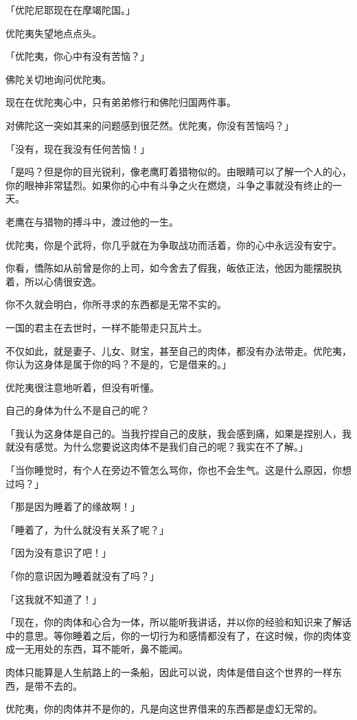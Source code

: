 \documentclass[twoside,openany]{book}
\begin{document}
「优陀尼耶现在在摩竭陀国。」

优陀夷失望地点点头。

「优陀夷，你心中有没有苦恼？」

佛陀关切地询问优陀夷。

现在在优陀夷心中，只有弟弟修行和佛陀归国两件事。

对佛陀这一突如其来的问题感到很茫然。优陀夷，你没有苦恼吗？」

「没有，现在我没有任何苦恼！」

「是吗？但是你的目光锐利，像老鹰盯着猎物似的。由眼睛可以了解一个人的心，你的眼神非常猛烈。如果你的心中有斗争之火在燃烧，斗争之事就没有终止的一天。

老鹰在与猎物的搏斗中，渡过他的一生。

优陀夷，你是个武将，你几乎就在为争取战功而活着，你的心中永远没有安宁。

你看，憍陈如从前曾是你的上司，如今舍去了假我，皈依正法，他因为能摆脱执着，所以心倩很安逸。

你不久就会明白，你所寻求的东西都是无常不实的。

一国的君主在去世时，一样不能带走只瓦片土。

不仅如此，就是妻子、儿女、财宝，甚至自己的肉体，都没有办法带走。优陀夷，你认为这身体是属于你的吗？不是的，它是借来的。」

优陀夷很注意地听着，但没有听懂。

自己的身体为什么不是自己的呢？

「我认为这身体是自己的。当我拧捏自己的皮肤，我会感到痛，如果是捏别人，我就没有感觉。为什么您要说这肉体不是我们自己的呢？我实在不了解。」

「当你睡觉时，有个人在旁边不管怎么骂你，你也不会生气。这是什么原因，你想过吗？」

「那是因为睡着了的缘故啊！」

「睡着了，为什么就没有关系了呢？」

「因为没有意识了吧！」

「你的意识因为睡着就没有了吗？」

「这我就不知道了！」

「现在，你的肉体和心合为一体，所以能听我讲话，并以你的经验和知识来了解话中的意思。等你睡着之后，你的一切行为和感情都没有了，在这时候，你的肉体变成一无用处的东西，耳不能听，鼻不能闻。

肉体只能算是人生航路上的一条船，因此可以说，肉体是借自这个世界的一样东西，是带不去的。

优陀夷，你的肉体并不是你的，凡是向这世界借来的东西都是虚幻无常的。
\end{document}
